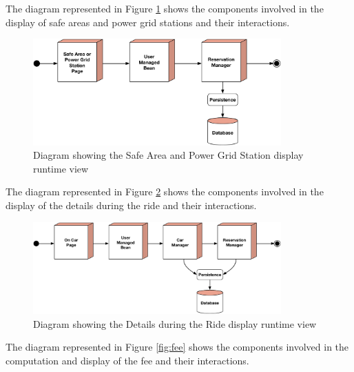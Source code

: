 \newline
The diagram represented in Figure \ref{fig:display} shows the components involved in the display of safe areas and power grid stations and their interactions.

\begin{figure}[htbp]
\centering
\vspace{104pt}
\includegraphics[width=0.85\textwidth]{Images/DisplayRun.pdf}
\vspace{10pt}
\caption{Diagram showing the Safe Area and Power Grid Station display runtime view}
\label{fig:display}
\end{figure}
\clearpage

\newline
The diagram represented in Figure \ref{fig:ride} shows the components involved in the display of the details during the ride and their interactions.

\begin{figure}[htbp]
\centering
\vspace{104pt}
\includegraphics[width=0.85\textwidth]{Images/RideRun.pdf}
\vspace{10pt}
\caption{Diagram showing the Details during the Ride display runtime view}
\label{fig:ride}
\end{figure}
\clearpage

\newline
The diagram represented in Figure \ref{fig:fee} shows the components involved in the computation and display of the fee and their interactions.

